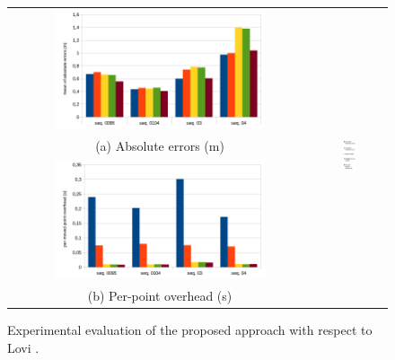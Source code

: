 \begin{figure}[t]
\centering
  \begin{tabular}{cc}
    \centering
    \includegraphics[width=0.72\textwidth]{./img/results.pdf}&
    \multirow{4}{*}{\includegraphics[width=0.19\textwidth]{./img/legenda}}\\
    (a) Absolute errors (m)\\
    \includegraphics[width=0.72\textwidth]{./img/resultsTiming.pdf}\\
    (b) Per-point overhead (s)\\
  \end{tabular}
  \caption{Experimental evaluation of the proposed approach with respect to Lovi \etal \cite{lovi_et_al_11}.}
   \label{tab:results}
\end{figure}


